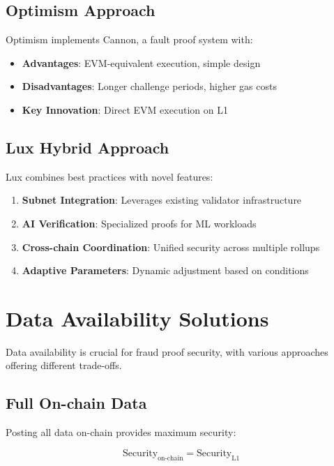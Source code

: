 \documentclass[11pt,a4paper]{article}
\theoremstyle{definition}
\begin{document}
\subsection{Optimism Approach}

Optimism implements Cannon, a fault proof system with:

\begin{itemize}
    \item \textbf{Advantages}: EVM-equivalent execution, simple design
    \item \textbf{Disadvantages}: Longer challenge periods, higher gas costs
    \item \textbf{Key Innovation}: Direct EVM execution on L1
\end{itemize}

\subsection{Lux Hybrid Approach}

Lux combines best practices with novel features:

\begin{enumerate}
    \item \textbf{Subnet Integration}: Leverages existing validator infrastructure
    \item \textbf{AI Verification}: Specialized proofs for ML workloads
    \item \textbf{Cross-chain Coordination}: Unified security across multiple rollups
    \item \textbf{Adaptive Parameters}: Dynamic adjustment based on conditions
\end{enumerate}

\section{Data Availability Solutions}

Data availability is crucial for fraud proof security, with various approaches offering different trade-offs.

\subsection{Full On-chain Data}

Posting all data on-chain provides maximum security:

\begin{equation}
\text{Security}_{\text{on-chain}} = \text{Security}_{\text{L1}}
\end{equation}
\end{document}
